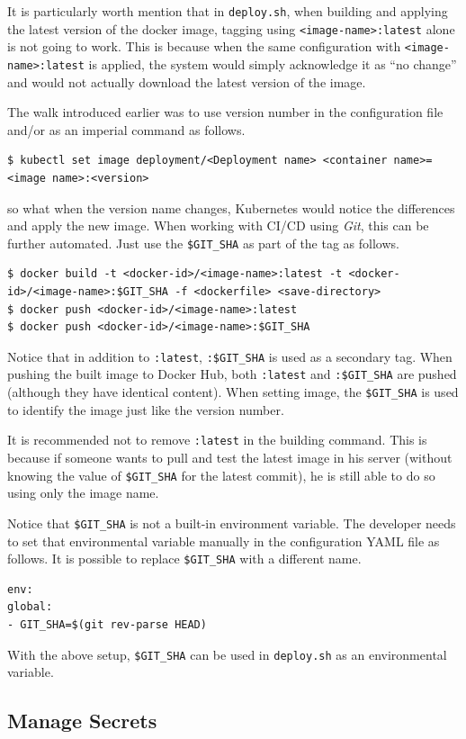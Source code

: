 It is particularly worth mention that in \verb|deploy.sh|, when building and applying the latest version of the docker image, tagging using \verb|<image-name>:latest| alone is not going to work. This is because when the same configuration with \verb|<image-name>:latest| is applied, the system would simply acknowledge it as ``no change'' and would not actually download the latest version of the image.

The walk introduced earlier was to use version number in the configuration file and/or as an imperial command as follows.
\begin{lstlisting}
$ kubectl set image deployment/<Deployment name> <container name>=<image name>:<version>
\end{lstlisting}
so what when the version name changes, Kubernetes would notice the differences and apply the new image. When working with CI/CD using \textit{Git}, this can be further automated. Just use the \verb|$GIT_SHA| as part of the tag as follows.
\begin{lstlisting}
$ docker build -t <docker-id>/<image-name>:latest -t <docker-id>/<image-name>:$GIT_SHA -f <dockerfile> <save-directory>
$ docker push <docker-id>/<image-name>:latest
$ docker push <docker-id>/<image-name>:$GIT_SHA
\end{lstlisting}
Notice that in addition to \verb|:latest|, \verb|:$GIT_SHA| is used as a secondary tag. When pushing the built image to Docker Hub, both \verb|:latest| and \verb|:$GIT_SHA| are pushed (although they have identical content). When setting image, the \verb|$GIT_SHA| is used to identify the image just like the version number.

It is recommended not to remove \verb|:latest| in the building command. This is because if someone wants to pull and test the latest image in his server (without knowing the value of \verb|$GIT_SHA| for the latest commit), he is still able to do so using only the image name.

Notice that \verb|$GIT_SHA| is not a built-in environment variable. The developer needs to set that environmental variable manually in the configuration YAML file as follows. It is possible to replace \verb|$GIT_SHA| with a different name.
\begin{lstlisting}
env:
global:
- GIT_SHA=$(git rev-parse HEAD)
\end{lstlisting}
With the above setup, \verb|$GIT_SHA| can be used in \verb|deploy.sh| as an environmental variable.

\subsection{Manage Secrets}

